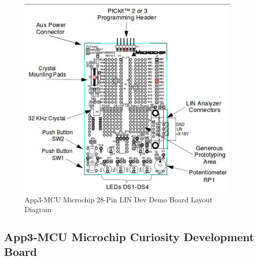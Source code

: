 \pagebreak
\begin{figure}[htbp]
	\begin{center}
		\includegraphics[width=0.95\textwidth]{./07-images/img-Ch3App/MCU-Microchip-28-Pin-LIN-Dev-Demo-Board.jpg}
		\caption{App3-MCU Microchip 28-Pin LIN Dev Demo Board Layout Diagram}
		\label{fig:App3-MCU-Microchip-28-Pin-LIN-Dev-Demo-Board.jpg}
	\end{center}
\end{figure}



\pagebreak
\subsection{App3-MCU Microchip Curiosity Development Board}\label{sec:C-3.5-Curiosity-Development-Board}

